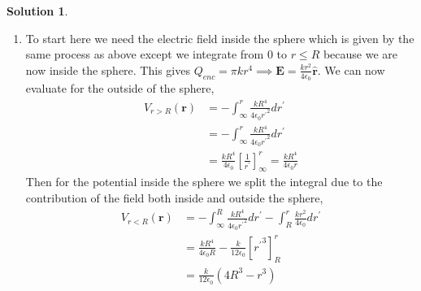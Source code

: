 \documentclass[10pt]{article}
\theoremstyle{definition}
\newtheorem{soln}{Solution}
\newcommand{\primed}[1]{#1^\prime}
\begin{document}
\begin{soln}
\begin{enumerate}[label=(\roman*)]
          (For $r>R$)
    \item To start here we need the electric field inside the sphere which is given by the same process as above except we integrate from $0$ to $r\leq R$
          because we are now inside the sphere. This gives $Q_{enc}=\pi kr^4\implies \mathbf{E}=\displaystyle\frac{kr^2}{4\epsilon_0}\hat{\mathbf{r}}$. We can now evaluate for the outside of the sphere,
          \begin{align*}
            V_{r>R}(\mathbf{r}) & =-\int_\infty^r\frac{kR^4}{4\epsilon_0 {\primed{r}}^2}d\primed{r}                             \\
                       & =-\int_\infty^r\frac{kR^4}{4\epsilon_0 {\primed{r}}^2}d\primed{r}                             \\
                       & =\frac{kR^4}{4\epsilon_0}\left[\frac{1}{\primed{r}}\right]_\infty^r=\frac{kR^4}{4\epsilon_0r}
          \end{align*}
          Then for the potential inside the sphere we split the integral due to the contribution of the field both inside and outside the sphere,
          \begin{align*}
            V_{r<R}(\mathbf{r}) & =-\int_\infty^R\frac{kR^4}{4\epsilon_0 {\primed{r}}^2}d\primed{r}-\int_R^r\frac{kr^2}{4\epsilon_0}d\primed{r} \\
                       & =\frac{kR^4}{4\epsilon_0R}-\frac{k}{12\epsilon_0}\left[{\primed{r}}^3\right]_R^r                              \\
                       & =\frac{k}{12\epsilon_0}\left(4R^3-r^3\right)
          \end{align*}
  \end{enumerate}
\end{soln}
\end{document}
